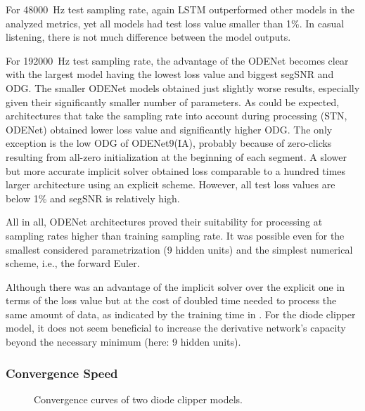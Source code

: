 For \SI{48000}{Hz} test sampling rate, again \ac{LSTM} outperformed other models in the analyzed metrics, yet all models had test loss value smaller than 1\%. In casual listening, there is not much difference between the model outputs.

For \SI{192000}{Hz} test sampling rate, the advantage of the ODENet becomes clear with the largest model having the lowest loss value and biggest \ac{segSNR} and \ac{ODG}. The smaller ODENet models obtained just slightly worse results, especially given their significantly smaller number of parameters. As could be expected, architectures that take the sampling rate into account during processing (\ac{STN}, ODENet) obtained lower loss value and significantly higher \ac{ODG}. The only exception is the low \ac{ODG} of ODENet9(IA), probably because of zero-clicks resulting from all-zero initialization at the beginning of each segment. A slower but more accurate implicit solver obtained loss comparable to a hundred times larger architecture using an explicit scheme. However, all test loss values are below 1\% and \ac{segSNR} is relatively high.

All in all, ODENet architectures proved their suitability for processing at sampling rates higher than training sampling rate. It was possible even for the smallest considered parametrization (9 hidden units) and the simplest numerical scheme, i.e., the forward Euler. 

Although there was an advantage of the implicit solver over the explicit one in terms of the loss value but at the cost of doubled time needed to process the same amount of data, as indicated by the training time in . For the diode clipper model, it does not seem beneficial to increase the derivative network's capacity beyond the necessary minimum (here: 9 hidden units). 

\subsubsection{Convergence Speed}

\begin{figure}
    \centering
    
    \caption{Convergence curves of two diode clipper models.}
    \label{fig:diode_clipper_validation_curves}
\end{figure}

